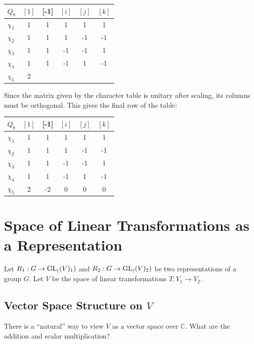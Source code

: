 \documentclass[12pt]{article}
\begin{document}
\begin{center}
  \begin{tabular}{l | ccccc}
    $Q_8$ & $[1]$ & [-1] & $[i]$ & $[j]$ & $[k]$ \\
    \midrule
    $\chi_1$ & 1 & 1  & 1 & 1 & 1 \\
    $\chi_2$ & 1 & 1 & 1 & -1 & -1 \\
    $\chi_3$ & 1 & 1 & -1 & -1 & 1 \\
    $\chi_4$ & 1 & 1 & -1 & 1 & -1 \\
    $\chi_5$ & 2 &  &  &  &
  \end{tabular}
\end{center}
Since the matrix given by the character table is unitary after scaling, its columns must be orthogonal. 
This gives the final row of the table: 
\begin{center}
  \begin{tabular}{l | ccccc}
    $Q_8$ & $[1]$ & [-1] & $[i]$ & $[j]$ & $[k]$ \\
    \midrule
    $\chi_1$ & 1 & 1  & 1 & 1 & 1 \\
    $\chi_2$ & 1 & 1 & 1 & -1 & -1 \\
    $\chi_3$ & 1 & 1 & -1 & -1 & 1 \\
    $\chi_4$ & 1 & 1 & -1 & 1 & -1 \\
    $\chi_5$ & 2 & -2 & 0 & 0 & 0
  \end{tabular}
\end{center}



\section{Space of Linear Transformations as a Representation}
Let $R_1: G \rightarrow \text{GL}_{(}(V)_1)$ and $R_2: G \rightarrow \text{GL}_{(}(V)_2)$ be two representations of a group $G$. 
Let $V$ be the space of linear transformations $T \colon V_1 \to V_2$.

\subsection{Vector Space Structure on $V$}
\newcommand{\calH}{\mathcal{H}}

There is a ``natural'' way to view $V$ as a vector space over $\mathbb{C}$.
What are the addition and scalar multiplication?

\noindent\dotfill
\end{document}
